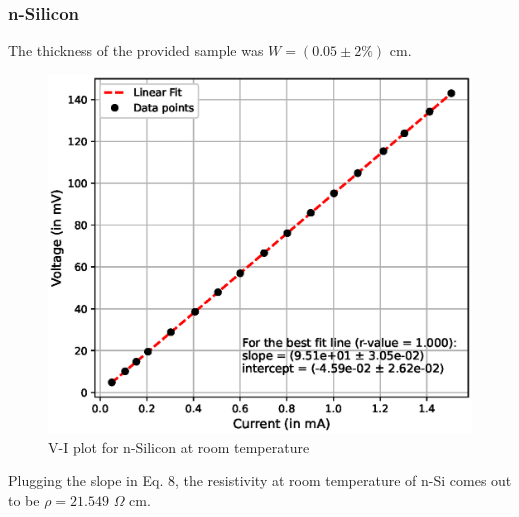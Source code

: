 \subsubsection{n-Silicon}
The thickness of the provided sample was $W=(0.05 \pm 2\%)$ cm.
\begin{figure}[H]   
    \centering
    \includegraphics[width=1\columnwidth]{images/si.eps}
    \caption{V-I plot for n-Silicon at room temperature}
    \label{2}
\end{figure}
Plugging the slope in Eq. 8, the resistivity at room temperature of n-Si comes out to be $\rho = 21.549\,\,\Omega$ cm.
\vspace{-3em}
